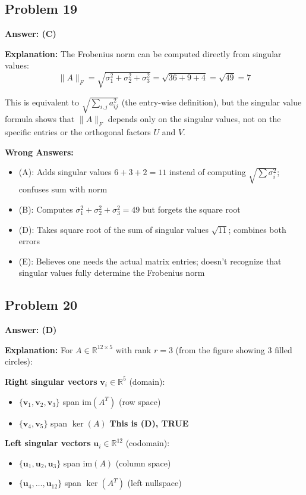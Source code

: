 \documentclass[12pt]{amsart}
\newcommand{\correct}[1]{{\color{correctgreen}\textbf{#1}}}
\begin{document}
\begin{itemize}
\subsection*{Problem 19}
\correct{Answer: (C)}

\textbf{Explanation:} The Frobenius norm can be computed directly from singular values:
$$\|A\|_F = \sqrt{\sigma_1^2 + \sigma_2^2 + \sigma_3^2} = \sqrt{36 + 9 + 4} = \sqrt{49} = 7$$

This is equivalent to $\sqrt{\sum_{i,j} a_{ij}^2}$ (the entry-wise definition), but the singular value formula shows that $\|A\|_F$ depends only on the singular values, not on the specific entries or the orthogonal factors $U$ and $V$.

\textbf{Wrong Answers:}
\begin{itemize}
\item (A): Adds singular values $6 + 3 + 2 = 11$ instead of computing $\sqrt{\sum \sigma_i^2}$; confuses sum with norm
\item (B): Computes $\sigma_1^2 + \sigma_2^2 + \sigma_3^2 = 49$ but forgets the square root
\item (D): Takes square root of the sum of singular values $\sqrt{11}$; combines both errors
\item (E): Believes one needs the actual matrix entries; doesn't recognize that singular values fully determine the Frobenius norm
\end{itemize}

\subsection*{Problem 20}
\correct{Answer: (D)}

\textbf{Explanation:} For $A \in \mathbb{R}^{12 \times 5}$ with rank $r = 3$ (from the figure showing 3 filled circles):

\textbf{Right singular vectors} $\mathbf{v}_i \in \mathbb{R}^{5}$ (domain):
\begin{itemize}
\item $\{\mathbf{v}_1, \mathbf{v}_2, \mathbf{v}_3\}$ span $\text{im}(A^T)$ (row space)
\item $\{\mathbf{v}_4, \mathbf{v}_5\}$ span $\ker(A)$ \checkmark \textbf{This is (D), TRUE}
\end{itemize}

\textbf{Left singular vectors} $\mathbf{u}_i \in \mathbb{R}^{12}$ (codomain):
\begin{itemize}
\item $\{\mathbf{u}_1, \mathbf{u}_2, \mathbf{u}_3\}$ span $\text{im}(A)$ (column space)
\item $\{\mathbf{u}_4, \ldots, \mathbf{u}_{12}\}$ span $\ker(A^T)$ (left nullspace)
\end{itemize}


\end{itemize}
\end{document}
